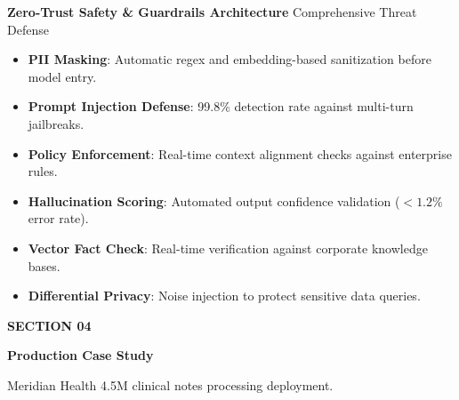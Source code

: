 \documentclass[20pt,landscape,a4paper]{foils}
\newcommand{\SlideHeader}[2]{%
  \begin{tcolorbox}[headerbox]
    {\Huge\bfseries #1} \hfill {\large\textcolor{SlateBorder}{#2}}
  \end{tcolorbox}
  \vspace{6pt}
}
\begin{document}
\SlideHeader{Zero-Trust Safety \& Guardrails Architecture}{Comprehensive Threat Defense}

\noindent
\begin{minipage}[t]{0.48\textwidth}
  \begin{tcolorbox}[accentbox, title={\textcolor{NavyPrimary}{\large \faLock~ \textbf{Input Guardrails}}}, fonttitle=\bfseries]
    \begin{itemize}[leftmargin=14pt, label=\textcolor{TealAccent}{\small\faCheck}]
      \item \textbf{PII Masking}: Automatic regex and embedding-based sanitization before model entry.
      \item \textbf{Prompt Injection Defense}: 99.8\% detection rate against multi-turn jailbreaks.
      \item \textbf{Policy Enforcement}: Real-time context alignment checks against enterprise rules.
    \end{itemize}
  \end{tcolorbox}
\end{minipage}%
\hfill
\begin{minipage}[t]{0.48\textwidth}
  \begin{tcolorbox}[accentbox, title={\textcolor{NavyPrimary}{\large \faLock~ \textbf{Output Verification}}}, fonttitle=\bfseries]
    \begin{itemize}[leftmargin=14pt, label=\textcolor{TealAccent}{\small\faCheck}]
      \item \textbf{Hallucination Scoring}: Automated output confidence validation ($<1.2\%$ error rate).
      \item \textbf{Vector Fact Check}: Real-time verification against corporate knowledge bases.
      \item \textbf{Differential Privacy}: Noise injection to protect sensitive data queries.
    \end{itemize}
  \end{tcolorbox}
\end{minipage}
\pagebreak

\vspace*{0.8cm}
\begin{tcolorbox}[enhanced, colback=SlateLight, colframe=NavyPrimary, boxrule=3pt, arc=6pt, boxsep=16pt]
  \textcolor{TealAccent}{\Large \textbf{SECTION 04}} \par\vspace{6pt}
  {\Huge\bfseries Production Case Study} \par\vspace{10pt}
  \textcolor{CharcoalText}{\large Meridian Health 4.5M clinical notes processing deployment.}
\end{tcolorbox}
\pagebreak
\end{document}
